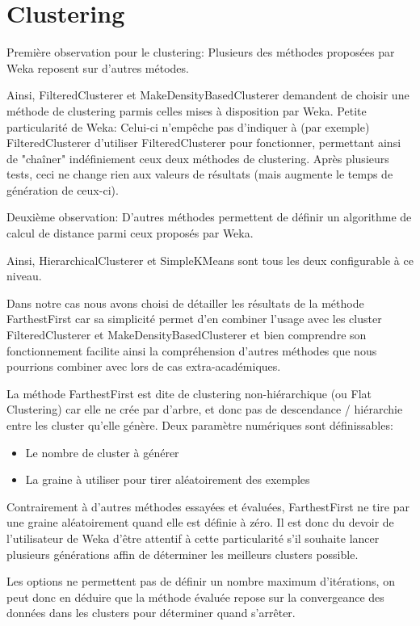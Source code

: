 \section{Clustering}

Première observation pour le clustering: Plusieurs des méthodes proposées par Weka reposent sur d'autres métodes.

Ainsi, FilteredClusterer et MakeDensityBasedClusterer demandent de choisir une méthode de clustering parmis celles mises à disposition par Weka.
Petite particularité de Weka: Celui-ci n'empêche pas d'indiquer à (par exemple) FilteredClusterer d'utiliser FilteredClusterer pour fonctionner, permettant ainsi de "chaîner" indéfiniement ceux deux méthodes de clustering.
Après plusieurs tests, ceci ne change rien aux valeurs de résultats (mais augmente le temps de génération de ceux-ci).

Deuxième observation: D'autres méthodes permettent de définir un algorithme de calcul de distance parmi ceux proposés par Weka.

Ainsi, HierarchicalClusterer et SimpleKMeans sont tous les deux configurable à ce niveau.

Dans notre cas nous avons choisi de détailler les résultats de la méthode FarthestFirst car sa simplicité permet d'en combiner l'usage avec les cluster FilteredClusterer et MakeDensityBasedClusterer et bien comprendre son fonctionnement facilite ainsi la compréhension d'autres méthodes que nous pourrions combiner avec lors de cas extra-académiques.

La méthode FarthestFirst est dite de clustering non-hiérarchique (ou Flat Clustering) car elle ne crée par d'arbre, et donc pas de descendance / hiérarchie entre les cluster qu'elle génère.
Deux paramètre numériques sont définissables:
\begin{itemize}
	\item{Le nombre de cluster à générer}
	\item{La graine à utiliser pour tirer aléatoirement des exemples}
\end{itemize}

Contrairement à d'autres méthodes essayées et évaluées, FarthestFirst ne tire par une graine aléatoirement quand elle est définie à zéro.
Il est donc du devoir de l'utilisateur de Weka d'être attentif à cette particularité s'il souhaite lancer plusieurs générations affin de déterminer les meilleurs clusters possible.

Les options ne permettent pas de définir un nombre maximum d'itérations, on peut donc en déduire que la méthode évaluée repose sur la convergeance des données dans les clusters pour déterminer quand s'arrêter.

